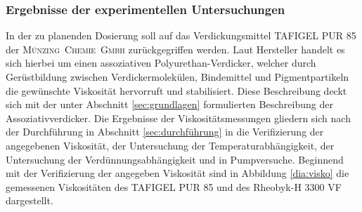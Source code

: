 %

\subsubsection{Ergebnisse der experimentellen Untersuchungen}
In der zu planenden Dosierung soll auf das Verdickungsmittel TAFIGEL PUR 85 der \mbox{\textsc{Münzing Chemie Gmbh}} zurückgegriffen werden. Laut Hersteller handelt es sich hierbei um einen assoziativen Polyurethan-Verdicker, welcher durch Gerüstbildung zwischen Verdickermolekülen, Bindemittel und Pigmentpartikeln die gewünschte Viskosität hervorruft und stabilisiert. Diese Beschreibung deckt sich mit der unter Abschnitt \ref{sec:grundlagen} formulierten Beschreibung der Assoziativverdicker. \cite{MunzingChemieGmbH.2014}
Die Ergebnisse der Viskositätsmessungen gliedern sich nach der Durchführung in Abschnitt \ref{sec:durchführung} in die Verifizierung der angegebenen Viskosität, der Untersuchung der Temperaturabhängigkeit, der Untersuchung der Verdünnungsabhängigkeit und in Pumpversuche.
Beginnend mit der Verifizierung der angegeben Viskosität sind in Abbildung \ref{dia:visko} die gemessenen Viskositäten des TAFIGEL PUR 85 und des Rheobyk-H 3300 VF dargestellt. 



